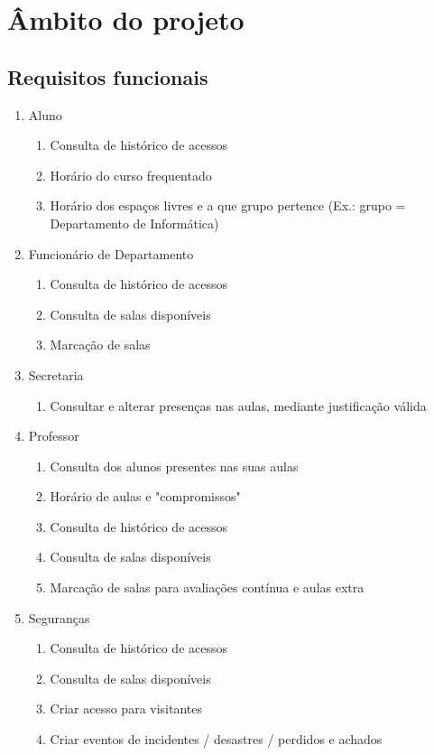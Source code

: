\documentclass[a4paper]{report}
\begin{document}
\chapter{Âmbito do projeto}
\section{Requisitos funcionais}
\begin{enumerate}
\item Aluno
	\begin{enumerate}
	\item Consulta de histórico de acessos
    \item Horário do curso frequentado
    \item Horário dos espaços livres e a que grupo pertence (Ex.: grupo = Departamento de Informática)
	\end{enumerate}
\item Funcionário de Departamento
	\begin{enumerate}
    \item Consulta de histórico de acessos
    \item Consulta de salas disponíveis
    \item Marcação de salas
	\end{enumerate}
\item Secretaria
	\begin{enumerate}
    \item Consultar e alterar presenças nas aulas, mediante justificação válida
	\end{enumerate}
\item Professor
	\begin{enumerate}
	\item Consulta dos alunos presentes nas suas aulas
    \item Horário de aulas e "compromissos"
    \item Consulta de histórico de acessos
    \item Consulta de salas disponíveis
    \item Marcação de salas para avaliações contínua e aulas extra
	\end{enumerate}
\item Seguranças
	\begin{enumerate}
    \item Consulta de histórico de acessos
    \item Consulta de salas disponíveis
    \item Criar acesso para visitantes
    \item Criar eventos de incidentes / desastres / perdidos e achados

\end{enumerate}
\end{enumerate}
\end{document}
